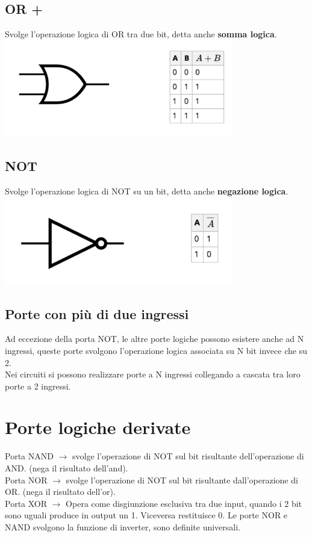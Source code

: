 \documentclass[12pt, a4paper, openany]{book}
\begin{document}
\subsection{OR +}
Svolge l'operazione logica di OR tra due bit, detta anche \textbf{somma logica}.
\includegraphics[width=100mm, scale=0.6]{tabella_or.png}

\subsection{NOT}
Svolge l'operazione logica di NOT su un bit, detta anche \textbf{negazione logica}.
\includegraphics[width=100mm, scale=0.6]{tabella not.png}

\subsection{Porte con più di due ingressi}
Ad eccezione della porta NOT, le altre porte logiche possono esistere anche ad N ingressi, queste porte
svolgono l'operazione logica associata su N bit invece che su 2.
\\ Nei circuiti si possono realizzare porte a N ingressi collegando a cascata tra loro porte a 2 ingressi.

\section{Porte logiche derivate}
Porta NAND $\to$ svolge l'operazione di NOT sul bit risultante dell'operazione di AND. 
(nega il risultato dell'and).
\\ Porta NOR $ \to $ svolge l'operazione di NOT sul bit risultante dall'operazione di OR.
(nega il risultato dell'or).
\\ Porta XOR $ \to $ Opera come disgiunzione esclusiva tra due input, quando i 2 bit sono uguali produce in output un 1. 
Viceversa restituisce 0.
Le porte NOR e NAND svolgono la funzione di inverter, sono definite universali.
\end{document}
